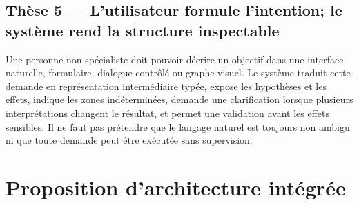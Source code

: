 \documentclass[11pt,a4paper]{article}
\begin{document}
\subsection{Thèse 5 — L'utilisateur formule l'intention; le système rend la structure inspectable}
Une personne non spécialiste doit pouvoir décrire un objectif dans une interface naturelle, formulaire, dialogue contrôlé ou graphe visuel. Le système traduit cette demande en représentation intermédiaire typée, expose les hypothèses et les effets, indique les zones indéterminées, demande une clarification lorsque plusieurs interprétations changent le résultat, et permet une validation avant les effets sensibles. Il ne faut pas prétendre que le langage naturel est toujours non ambigu ni que toute demande peut être exécutée sans supervision.

\section{Proposition d'architecture intégrée}
\end{document}
